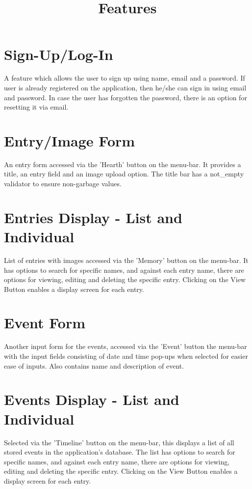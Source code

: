 \documentclass[11pt]{article}
\title{\textbf{Features}}
\author{}
\date{}
\begin{document}
\maketitle

\section{Sign-Up/Log-In}

A feature which allows the user to sign up using name, email and a password. If user is already registered on the application, then he/she can sign in using email and password. In case the user has forgotten the password, there is an option for resetting it via email.

\section{Entry/Image Form}
An entry form accessed via the 'Hearth' button on the menu-bar. It provides a title, an entry field and an image upload option. The title bar has a not\_empty validator to ensure non-garbage values. 

\section{Entries Display - List and Individual}
List of entries with images accessed via the 'Memory' button on the menu-bar. It has options to search for specific names, and against each entry name, there are options for viewing, editing and deleting the specific entry. Clicking on the View Button enables a display screen for each entry.

\section{Event Form}
Another input form for the events, accessed via the 'Event' button the menu-bar with the input fields consisting of date and time pop-ups when selected for easier ease of inputs. Also contains name and description of event. 

\section{Events Display - List and Individual}
 Selected via the 'Timeline' button on the menu-bar, this displays a list of all stored events in the application's database. The list has options to search for specific names, and against each entry name, there are options for viewing, editing and deleting the specific entry. Clicking on the View Button enables a display screen for each entry.
 
\end{document}
